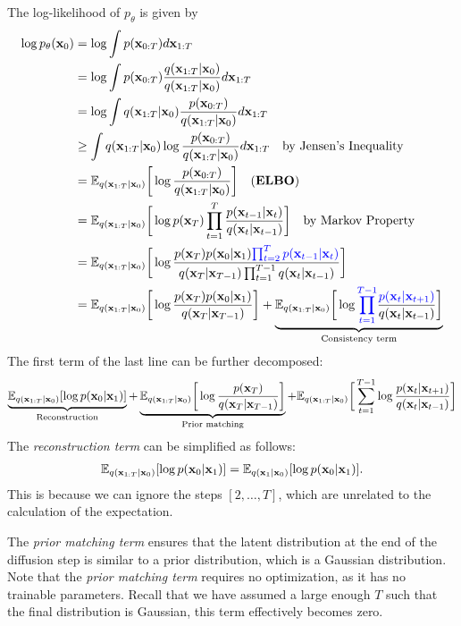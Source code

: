 The log-likelihood of $p_\theta$ is given by
\begin{align}
\log p_\theta({\mathbf{x}}_0) &=  \log\int p({\mathbf{x}}_{0:T})d{\mathbf{x}}_{1:T}\\
	&= \log\int p({\mathbf{x}}_{0:T})\frac{q({\mathbf{x}}_{1:T}|{\mathbf{x}}_0)}{q({\mathbf{x}}_{1:T}|{\mathbf{x}}_0)}d{\mathbf{x}}_{1:T}\\
	&= \log\int q({\mathbf{x}}_{1:T}|{\mathbf{x}}_0)\frac{p({\mathbf{x}}_{0:T})}{q({\mathbf{x}}_{1:T}|{\mathbf{x}}_0)}d{\mathbf{x}}_{1:T}\\
	&\geq \int q({\mathbf{x}}_{1:T}|{\mathbf{x}}_0)\log\frac{p({\mathbf{x}}_{0:T})}{q({\mathbf{x}}_{1:T}|{\mathbf{x}}_0)}d{\mathbf{x}}_{1:T}\quad \text{by Jensen's Inequality}\\
	&= \mathbb{E}_{q({\mathbf{x}}_{1:T}|{\mathbf{x}}_0)}\bigg[\log\frac{p({\mathbf{x}}_{0:T})}{q({\mathbf{x}}_{1:T}|{\mathbf{x}}_0)}\bigg] \quad (\textbf{ELBO})\\
	&= \mathbb{E}_{q({\mathbf{x}}_{1:T}|{\mathbf{x}}_0)}\bigg[\log p({\mathbf{x}}_T)\prod_{t=1}^T\frac{p({\mathbf{x}}_{t-1}|{\mathbf{x}}_t)}{q({\mathbf{x}}_{t}|{\mathbf{x}}_{t-1})}\bigg]\quad \text{by Markov Property}\\
	&= \mathbb{E}_{q({\mathbf{x}}_{1:T}|{\mathbf{x}}_0)}\bigg[\log \frac{p({\mathbf{x}}_T)p({\mathbf{x}}_0|{\mathbf{x}}_{1})\textcolor{blue}{\prod_{t=2}^{T} p({\mathbf{x}}_{t-1}|{\mathbf{x}}_{t})}}{q({\mathbf{x}}_T|{\mathbf{x}}_{T-1})\prod_{t=1}^{T-1}  q({\mathbf{x}}_{t}|{\mathbf{x}}_{t-1})}\bigg]\\
	&= \mathbb{E}_{q({\mathbf{x}}_{1:T}|{\mathbf{x}}_0)}\bigg[\log \frac{p({\mathbf{x}}_T)p({\mathbf{x}}_0|{\mathbf{x}}_{1})}{q({\mathbf{x}}_T|{\mathbf{x}}_{T-1})}\bigg] + \underbrace{\mathbb{E}_{q({\mathbf{x}}_{1:T}|{\mathbf{x}}_0)}\bigg[\log \textcolor{blue}{\prod_{t=1}^{T-1}}\frac{\textcolor{blue}{p({\mathbf{x}}_{t}|{\mathbf{x}}_{t+1})}}{q({\mathbf{x}}_{t}|{\mathbf{x}}_{t-1})}\bigg]}_{\text{Consistency term}}
\end{align}
The first term of the last line can be further decomposed:
\begin{align*}
	\underbrace{\mathbb{E}_{q({\mathbf{x}}_{1:T}|{\mathbf{x}}_0)}[\log p({\mathbf{x}}_0|{\mathbf{x}}_{1})]}_{\text{Reconstruction}}+\underbrace{\mathbb{E}_{q({\mathbf{x}}_{1:T}|{\mathbf{x}}_0)}\bigg[\log \frac{p({\mathbf{x}}_T)}{q({\mathbf{x}}_T|{\mathbf{x}}_{T-1})}\bigg]}_{\text{Prior matching}}+\mathbb{E}_{q({\mathbf{x}}_{1:T}|{\mathbf{x}}_0)}\bigg[\sum_{t=1}^{T-1}\log \frac{ p({\mathbf{x}}_{t}|{\mathbf{x}}_{t+1})}{q({\mathbf{x}}_{t}|{\mathbf{x}}_{t-1})}\bigg]
\end{align*}
The \textit{reconstruction term} can be simplified as follows:
\begin{align*}
	\mathbb{E}_{q({\mathbf{x}}_{1:T}|{\mathbf{x}}_0)}[\log p({\mathbf{x}}_0|{\mathbf{x}}_{1})] = \mathbb{E}_{q({\mathbf{x}}_{1}|{\mathbf{x}}_0)}[\log p({\mathbf{x}}_0|{\mathbf{x}}_{1})]. 
\end{align*}
This is because we can ignore the steps $[2,\dots,T]$, which are unrelated to the calculation of the expectation. 

The \textit{prior matching term} ensures that the latent distribution at the end of the diffusion step is similar to a prior distribution, which is a Gaussian distribution. Note that the \textit{prior matching term} requires no optimization, as it has no trainable parameters. Recall that we have assumed a large enough $T$ such that the final distribution is Gaussian, this term effectively becomes zero.

